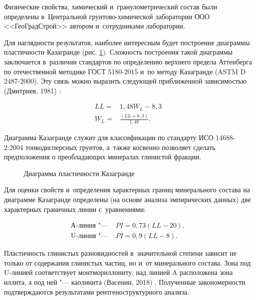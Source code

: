 Физические свойства, химический и~гранулометрический состав были определены в~Центральной грунтово-химической лаборатории ООО <<ГеоГрадСтрой>> автором и~сотрудниками лаборатории. 


Для наглядности результатов, наиболее интересным будет построение диаграммы пластичности Казагранде (рис. \ref{Fig:Caz}). 
Сложность построения такой диаграммы заключается в~различии стандартов по определению верхнего предела Аттенберга по отечественной методике ГОСТ 5180-2015 \cite{gost5180} и~по методу Казагранде (ASTM D 2487-2000). 
Эту связь можно выразить следующей приближенной зависимостью (Дмитриев, 1981) \cite{dmitriev1981}:

\begin{subequations}
    \label{eq:wlll}
    \begin{align}
        \label{eq:ll}
        LL = & 1,48W_L - 8,3 \\
        \label{eq:wl}
        W_L = & \frac{(LL + 8,3)}{1,48}.
    \end{align}
\end{subequations}


Диаграмма Казагранде служит для классификации по стандарту ИСО 14688-2:2004 тонкодисперсных грунтов, 
а~также косвенно позволяет сделать предположения о преобладающих минералах глинистой фракции. 

\begin{figure}[ht]
    \centering
    \small
    
    \caption{Диаграмма пластичности Казагранде}
    \label{Fig:Caz}
\end{figure}

Для оценки свойств и~определения характерных границ минерального состава на диаграмме Казагранде определены (на основе анализа эмпирических данных) две характерных граничных линии с~уравнениями:

\begin{subequations}
    \label{eq:over}
    \begin{align}
        \label{eq:a}
        \text{А-линия "--- } & PI = 0,73 (LL - 20),
        \\
        \label{eq:u}
        \text{U-линия "--- } & PI = 0,9 (LL - 8).
    \end{align}
\end{subequations}

Пластичность глинистых разновидностей в~значительной степени зависит не только от содержания глинистых частиц, но и~от минерального состава.
Зона под U-линией соответствует монтмориллониту, над линией A расположена зона иллита, а под ней "--- каолинита (Васенин, 2018) \cite{vasenin2018}.
Полученные закономерности подтверждаются результатами рентгеноструктурного анализа.


